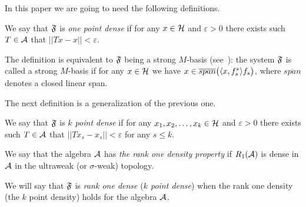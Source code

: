 \documentclass[12pt,oneside,a4paper]{amsart}
\begin{document}
  In this paper we are going to need the following definitions.
  \begin{definition}
    \label{1pd}
    We say that $\fsys$ is \emph{one point dense} if for any $x \in \cal{H}$ and $\varepsilon > 0$
      there exists such $T\in \cal{A}$ that $||Tx - x|| < \varepsilon$.
  \end{definition}

    The definition is equivalent to $\fsys$ being a strong $M$-basis (see~\cite{katavolos}):
    the system $\fsys$ is called a strong $M$-basis if for any $x\in\cal{H}$ we have $x \in \overline{span}\big(\inner{x}{f^*_s}f_s\big)$, where
      $\overline{span}$ denotes a closed linear span.

  The next definition is a generalization of the previous one.
  \begin{definition}
    \label{kpd}
    We say that $\fsys$ is \emph{$k$ point dense} if for any $x_1, x_2, \dots, x_k \in \cal{H}$ and $\varepsilon > 0$
      there exists such $T\in \cal{A}$ that $||Tx_s - x_s|| < \varepsilon$ for any $s \leq k$.
  \end{definition}

  \begin{definition}
    \label{r1d}
    We say that the algebra $\cal{A}$ has \emph{the rank one density property} if
      $R_1(\cal{A})$ is dense in $\cal{A}$ in the ultraweak (or $\sigma$-weak) topology.
  \end{definition}
  We will say that $\fsys$ is \emph{rank one dense} (\emph{$k$ point dense})
    when the rank one density (the $k$ point density) holds for the algebra $\cal{A}$.

\end{document}
